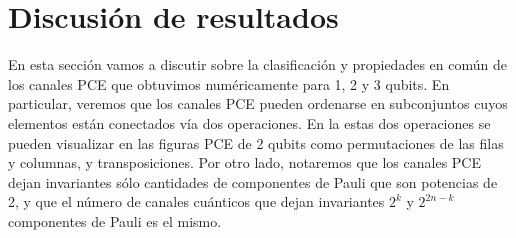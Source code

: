 \section{Discusión de resultados}\label{sec:ch3_discussion} %
En esta sección vamos a discutir sobre la clasificación y propiedades 
en común de los canales PCE que obtuvimos numéricamente para 1, 2 y 3 qubits.
En particular, veremos que 
los canales PCE pueden ordenarse en subconjuntos cuyos elementos 
están conectados vía dos operaciones. En la  
estas dos operaciones se pueden visualizar en las figuras PCE de 2 qubits 
como permutaciones de las filas y columnas, y transposiciones. Por otro lado, 
notaremos que los canales PCE dejan invariantes
sólo cantidades de componentes de Pauli que son potencias de 2, y que 
el número de canales cuánticos que dejan invariantes $2^k$ y $2^{2n-k}$ 
componentes de Pauli es el mismo. 

